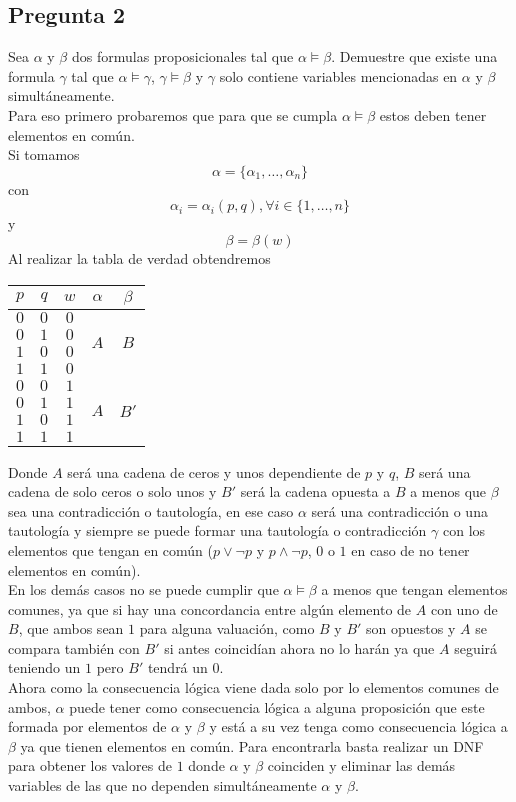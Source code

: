 \documentclass[letter]{article}
\begin{document}
	\begin{pregunta}{2}
		\section*{Pregunta 2}
		Sea $\alpha$ y $\beta$ dos formulas proposicionales tal que $\alpha \vDash \beta$. Demuestre que existe una formula $\gamma$ tal que $\alpha \vDash \gamma$, $\gamma \vDash \beta$ y $\gamma$ solo contiene variables mencionadas en $\alpha$ y $\beta$ simultáneamente.\\
		Para eso primero probaremos que para que se cumpla $\alpha \vDash \beta$ estos deben tener elementos en común.\\
		Si tomamos 
		$$\alpha = \{\alpha_1,\dots,\alpha_n\}$$ con $$\alpha_i = \alpha_i(p,q),\forall i \in \{1,\dots,n\}$$ y $$\beta = \beta(w)$$
		Al realizar la tabla de verdad obtendremos\\
		\begin{center}
		\begin{tabular}{c c c|c|c}
		$p$&$q$&$w$&$\alpha$&$\beta$\\
		\hline
		$0$&$0$&$0$&\multirow{4}{*}{$A$}&\multirow{4}{*}{$B$}\\
		$0$&$1$&$0$&&\\
		$1$&$0$&$0$&&\\
		$1$&$1$&$0$&&\\
		\hline%
		$0$&$0$&$1$&\multirow{4}{*}{$A$}&\multirow{4}{*}{$B'$}\\
		$0$&$1$&$1$&&\\
		$1$&$0$&$1$&&\\
		$1$&$1$&$1$&&\\
		\end{tabular}
		\end{center}
		Donde $A$ será una cadena de ceros y unos dependiente de $p$ y $q$, $B$ será una cadena de solo ceros o solo unos y $B'$ será la cadena opuesta a $B$ a menos que $\beta$ sea una contradicción o tautología, en ese caso $\alpha$ será una contradicción o una tautología y siempre se puede formar una tautología o contradicción $\gamma$ con los elementos que tengan en común ($p\vee \neg p$ y $p\wedge \neg p$, $0$ o $1$ en caso de no tener elementos en común).\\
		
		En los demás casos no se puede cumplir que $\alpha \vDash \beta$ a menos que tengan elementos comunes, ya que si hay una concordancia entre algún elemento de $A$ con uno de $B$, que ambos sean $1$ para alguna valuación, como $B$ y $B'$ son opuestos y $A$ se compara también con $B'$ si antes coincidían ahora no lo harán ya que $A$ seguirá teniendo un $1$ pero $B'$ tendrá un $0$. \\		
		
		Ahora como la consecuencia lógica viene dada solo por lo elementos comunes de ambos, $\alpha$ puede tener como consecuencia lógica a alguna proposición que este formada por elementos de $\alpha$ y $\beta$ y está a su vez tenga como consecuencia lógica a $\beta$ ya que tienen elementos en común. Para encontrarla basta realizar un DNF para obtener los valores de $1$ donde $\alpha$ y $\beta$ coinciden y eliminar las demás variables de las que no dependen simultáneamente $\alpha$ y $\beta$. 
	\end{pregunta}
\end{document}
